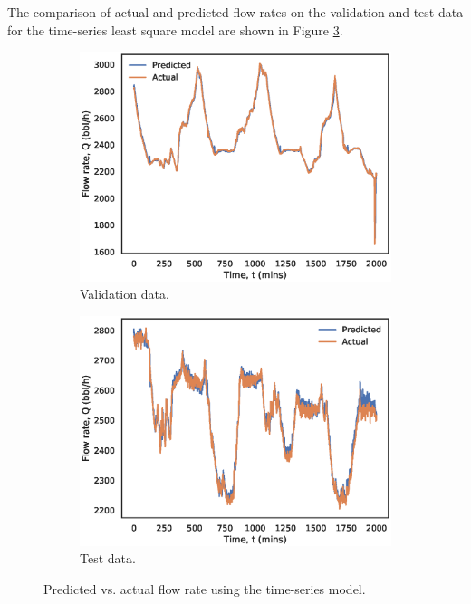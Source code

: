 The comparison of actual and predicted flow rates on the validation and test data for the time-series least square model are shown in Figure \ref{fig:08ts_ls}. 
\begin{figure}[h]
    \centering
     \begin{subfigure}[b]{0.48\textwidth}
         \includegraphics[width=\textwidth]{images/08ts_validation.eps}
         \caption{Validation data.}
         \label{fig:08ts_valid}
     \end{subfigure}
     \begin{subfigure}[b]{0.48\textwidth}
         \includegraphics[width=\textwidth]{images/08ts_test.eps}
         \caption{Test data.}
         \label{fig:08ts_test}
     \end{subfigure}
        \caption{Predicted vs. actual flow rate using the time-series model.}
        \label{fig:08ts_ls}
\end{figure}


